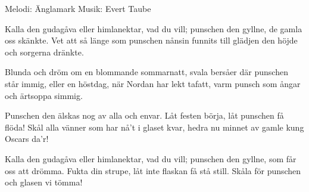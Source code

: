 \begin{song}

\begin{songmeta}
Melodi: Änglamark
Musik: Evert Taube
\end{songmeta}

\begin{songtext}
Kalla den gudagåva eller himlanektar, vad du vill;
punschen den gyllne, de gamla oss skänkte.
Vet att så länge som punschen nånsin funnits till
glädjen den höjde och sorgerna dränkte.

Blunda och dröm om en blommande sommarnatt,
svala bersåer där punschen står immig,
eller en höstdag, när Nordan har lekt tafatt,
varm punsch som ångar och ärtsoppa simmig.

Punschen den älskas nog av alla och envar.
Låt festen börja, låt punschen få flöda!
Skål alla vänner som har nå't i glaset kvar,
hedra nu minnet av gamle kung Oscars da'r!

Kalla den gudagåva eller himlanektar, vad du vill;
punschen den gyllne, som får oss att drömma.
Fukta din strupe, låt inte flaskan få stå still.
Skåla för punschen och glasen vi tömma!
\end{songtext}
\end{song}
